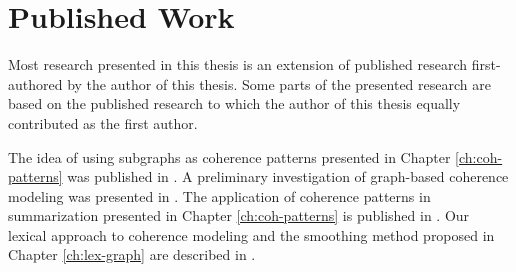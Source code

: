 \section{Published Work}
\label{sec:intro-published}

Most research presented in this thesis is an extension of published research first-authored by the author of this thesis. 
Some parts of the presented research are based on the published research to which the author of this thesis equally contributed as the first author. 

The idea of using subgraphs as coherence patterns presented in Chapter \ref{ch:coh-patterns} was published in . 
A preliminary investigation of graph-based coherence modeling was presented in . 
The application of coherence patterns in summarization presented in Chapter \ref{ch:coh-patterns} is published in . 
Our lexical approach to coherence modeling and the smoothing method proposed in Chapter \ref{ch:lex-graph} are described in .


